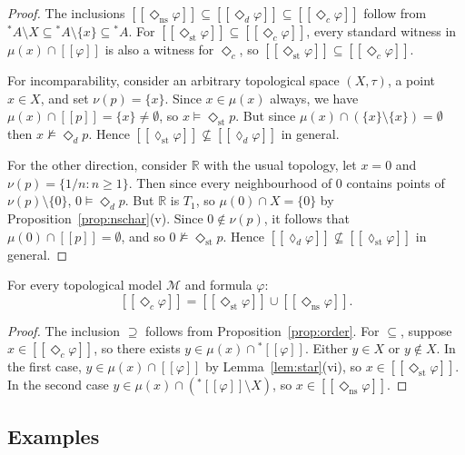 \documentclass[submission,copyright,creativecommons]{eptcs}
\newcommand{\sem}[1]{[\![#1]\!]}
\newcommand{\diam}{\Diamond}
\newcommand{\str}{{{}^{*}\!}}
\newcommand{\lozengens}{\diam_\mathrm{ns}}
\newcommand{\lozengest}{\lozenge_\mathrm{st}}
\begin{document}
\begin{proof}
The inclusions $\sem{\lozengens\varphi} \subseteq \sem{\diam_d\varphi} \subseteq \sem{\diam_c\varphi}$ follow from
$\str A \setminus X \subseteq \str A
\setminus \{x\} \subseteq \str A$.
For $\sem{\diam_\mathrm{st}\varphi} \subseteq \sem{\diam_c\varphi}$, every standard witness in
$\mu(x) \cap \sem{\varphi}$ is also a witness for $\diam_c$, so $\sem{\diam_\mathrm{st}\varphi} \subseteq \sem{\diam_c\varphi}$.

For incomparability, consider an arbitrary topological space $(X,\tau)$, a point $x \in X$, and set $\nu(p) = \{x\}$. 
Since $x \in \mu(x)$ always, we have $\mu(x) \cap \sem{p} = \{x\} \neq \emptyset$, so
$x \models \diam_\mathrm{st} p$. But since
$\mu(x)\cap (\{x\} \setminus \{x\}) = \emptyset$ then
$x \not\models \diam_d p$.
Hence $\sem{\lozengest\varphi} \not\subseteq \sem{\lozenge_d\varphi}$ in general.

For the other direction, consider $\mathbb{R}$ with the usual topology, let $x = 0$ and $\nu(p) = \{1/n : n \geq 1\}$. 
Then since every neighbourhood of $0$ contains points of $\nu(p) \setminus \{0\}$, $0 \models \diam_d p$. 
But $\mathbb{R}$ is $T_1$, so
$\mu(0) \cap X = \{0\}$ by Proposition~\ref{prop:nschar}(v).
Since $0 \notin \nu(p)$, it follows that $\mu(0) \cap \sem{p} = \emptyset$, and so
$0 \not\models \diam_\mathrm{st} p$.
Hence $\sem{\lozenge_d\varphi} \not\subseteq \sem{\lozengest\varphi}$ in general.
\end{proof}
\begin{proposition}
\label{prop:decomp}
For every topological model $\mathcal{M}$ and formula $\varphi$:
\[
  \sem{\diam_c\varphi} = \sem{\diam_\mathrm{st}\varphi} \cup \sem{\lozengens\varphi}.
\]
\end{proposition}

\begin{proof}
The inclusion $\supseteq$ follows from Proposition~\ref{prop:order}.
For $\subseteq$, suppose $x \in \sem{\diam_c\varphi}$, so there exists $y \in \mu(x) \cap \str\sem{\varphi}$.
Either $y \in X$ or $y \notin X$.
In the first case, $y \in \mu(x) \cap \sem{\varphi}$ by Lemma~\ref{lem:star}(vi), so $x \in \sem{\diam_\mathrm{st}\varphi}$.
In the second case $y \in \mu(x) \cap (\str\sem{\varphi} \setminus X)$, so $x \in \sem{\lozengens\varphi}$.
\end{proof}
\subsection{Examples}
\label{sec:examples}
\end{document}
